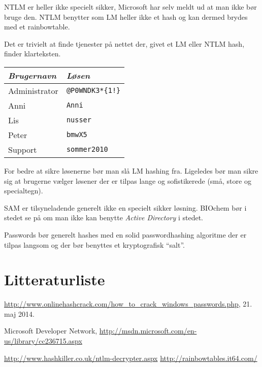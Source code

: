 \documentclass[10pt,a4paper,danish]{article}
\begin{document}
NTLM er heller ikke specielt sikker, Microsoft har selv meldt ud at man ikke bør
bruge den. NTLM benytter som LM heller ikke et hash og kan dermed brydes med et
rainbowtable.

Det er trivielt at finde tjenester\cite{cracker1} \cite{cracker2} på nettet der, givet et LM eller NTLM hash, finder
klarteksten.

\begin{table}[h!]
  \centering
  \begin{tabular}{ll}
    \textit{Brugernavn} & \textit{Løsen} \\
    \hline
    Administrator & \texttt{@P0WNDK3*\{1!\}}\\
    Anni & \texttt{Anni}\\
    Lis & \texttt{nusser}\\
    Peter & \texttt{bmwX5}\\
    Support & \texttt{sommer2010}
  \end{tabular}
\end{table}

For bedre at sikre løsenerne bør man slå LM hashing fra. Ligeledes bør man sikre
sig at brugerne vælger løsener der er tilpas lange og sofistikerede (små, store
og specialtegn).

SAM er tilsyneladende generelt ikke en specielt sikker løsning. BIOchem bør i stedet se på om
man ikke kan benytte \textit{Active Directory} i stedet.

Passwords bør generelt hashes med en solid passwordhashing algoritme der er
tilpas langsom og der bør benyttes et kryptografisk ``salt''.

\section{Litteraturliste}

\begin{thebibliography}{9}

  \url{http://www.onlinehashcrack.com/how_to_crack_windows_passwords.php}, 21.
  maj 2014.

 Microsoft Developer Network,
  \url{http://msdn.microsoft.com/en-us/library/cc236715.aspx}

 \url{http://www.hashkiller.co.uk/ntlm-decrypter.aspx}
 \url{http://rainbowtables.it64.com/}

\end{thebibliography}
\end{document}
